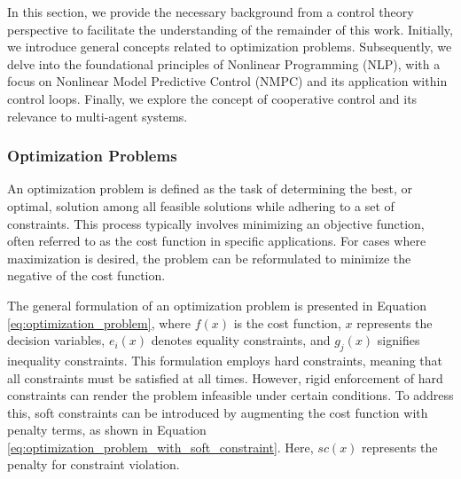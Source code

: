 In this section, we provide the necessary background from a control theory perspective to facilitate the understanding of the remainder of this work. Initially, we introduce general concepts related to optimization problems. Subsequently, we delve into the foundational principles of Nonlinear Programming (NLP), with a focus on Nonlinear Model Predictive Control (NMPC) and its application within control loops. Finally, we explore the concept of cooperative control and its relevance to multi-agent systems.

\subsubsection{Optimization Problems}

An optimization problem is defined as the task of determining the best, or optimal, solution among all feasible solutions while adhering to a set of constraints. This process typically involves minimizing an objective function, often referred to as the cost function in specific applications. For cases where maximization is desired, the problem can be reformulated to minimize the negative of the cost function.

The general formulation of an optimization problem is presented in Equation \ref{eq:optimization_problem}, where \( f(x) \) is the cost function, \( x \) represents the decision variables, \( e_i(x) \) denotes equality constraints, and \( g_j(x) \) signifies inequality constraints. This formulation employs hard constraints, meaning that all constraints must be satisfied at all times. However, rigid enforcement of hard constraints can render the problem infeasible under certain conditions. To address this, soft constraints can be introduced by augmenting the cost function with penalty terms, as shown in Equation \ref{eq:optimization_problem_with_soft_constraint}. Here, \( sc(x) \) represents the penalty for constraint violation.

